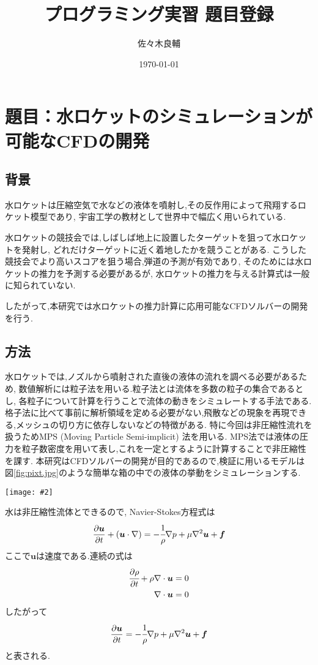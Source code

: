 \documentclass[uplatex,a4j,11pt]{jsarticle}
\makeatletter
\def\fgcaption{\def\@captype{figure}\caption}
\newcommand{\mfig}[3][width=15cm]{
\begin{center}
    \texttt{[image: \#2]}
\fgcaption{#3 \label{fig:#2}}
\end{center}
}
\makeatother
\begin{document}
\title{プログラミング実習 題目登録}
\author{佐々木良輔}
\date{\today}
\maketitle

\section*{題目：水ロケットのシミュレーションが可能なCFDの開発}
\subsection*{背景}
水ロケットは圧縮空気で水などの液体を噴射し,その反作用によって飛翔するロケット模型であり,
宇宙工学の教材として世界中で幅広く用いられている.

水ロケットの競技会では,しばしば地上に設置したターゲットを狙って水ロケットを発射し,
どれだけターゲットに近く着地したかを競うことがある.
こうした競技会でより高いスコアを狙う場合,弾道の予測が有効であり,
そのためには水ロケットの推力を予測する必要があるが,
水ロケットの推力を与える計算式は一般に知られていない.

したがって,本研究では水ロケットの推力計算に応用可能なCFDソルバーの開発を行う.
\subsection*{方法}
水ロケットでは,ノズルから噴射された直後の液体の流れを調べる必要があるため,
数値解析には粒子法を用いる.粒子法とは流体を多数の粒子の集合であるとし,
各粒子について計算を行うことで流体の動きをシミュレートする手法である.
格子法に比べて事前に解析領域を定める必要がない,飛散などの現象を再現できる,メッシュの切り方に依存しないなどの特徴がある.
特に今回は非圧縮性流れを扱うためMPS (Moving Particle Semi-implicit) 法を用いる.\cite{ryuusi}\cite{ELEM13}
MPS法では液体の圧力を粒子数密度を用いて表し,これを一定とするように計算することで非圧縮性を課す.
本研究はCFDソルバーの開発が目的であるので,検証に用いるモデルは図\ref{fig:pixt.jpg}のような簡単な箱の中での液体の挙動をシミュレーションする.
\mfig[width=6cm]{pixt.jpg}{検証モデル(青点：液体粒子,灰点：壁)\cite{ELEM13}}
水は非圧縮性流体とできるので, Navier-Stokes方程式は
\begin{align}
    \label{NSequ}
    \frac{\partial\bm{u}}{\partial t}+(\bm{u}\cdot\nabla)=-\cfrac{1}{\rho}\nabla p+\mu\nabla^2\bm{u}+\bm{f}
\end{align}
ここで$\bm{u}$は速度である.連続の式は
\begin{align}
    \label{cont1}
    \cfrac{\partial\rho}{\partial t}+\rho\nabla\cdot\bm{u}=0\\
    \label{cont2}
    \nabla\cdot\bm{u}=0
\end{align}
したがって
\begin{align}
    \label{NSequ2}
    \frac{\partial\bm{u}}{\partial t}=-\cfrac{1}{\rho}\nabla p+\mu\nabla^2\bm{u}+\bm{f}
\end{align}
と表される.
\end{document}
